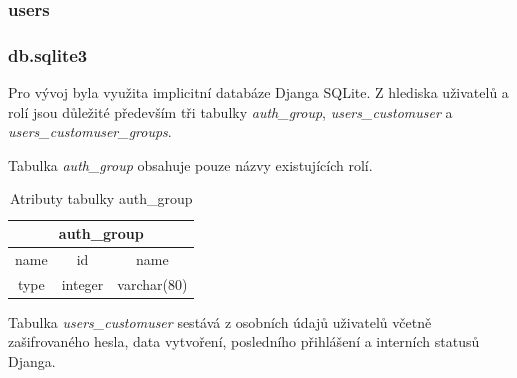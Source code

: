 \subsubsection{users}

\subsubsection{db.sqlite3}

Pro vývoj byla využita implicitní databáze Djanga SQLite. 
Z hlediska uživatelů a rolí jsou důležité především tři tabulky \textit{auth\_group}, \textit{users\_customuser} a \textit{users\_customuser\_groups}. 

Tabulka \textit{auth\_group} obsahuje pouze názvy existujících rolí.

\begin{table}[H]
\centering
\begin{tabular}{@{}|c|c|c|@{}}
\toprule
\multicolumn{3}{|c|}{auth\_group} \\ \midrule
name & id & name \\ \midrule
type & integer & varchar(80) \\ \bottomrule
\end{tabular}
\caption{Atributy tabulky auth\_group}
\label{tab:auth-group}
\end{table}

Tabulka \textit{users\_customuser} sestává z osobních údajů uživatelů včetně zašifrovaného hesla, data vytvoření, posledního přihlášení a interních statusů Djanga. 

\begin{table}[H]
\centering
{}
\caption{Atributy tabulky users\_customuser 1/2}
\label{tab:users-customuser-1}
\end{table}

\begin{table}[H]
\centering
{}
\caption{Atributy tabulky users\_customuser 2/2}
\label{tab:users-customuser-2}
\end{table}

